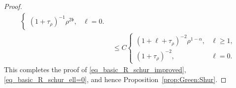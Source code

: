 \documentclass[10pt,a4paper]{amsart}
\begin{document}
\begin{proof}
\begin{align*}
\begin{cases}
        (1+\tau_\rho)^{-1} \rho^{2\mathfrak b}, & \ell=0.
    \end{cases} \\
    &\le C \begin{cases}
        (1+\ell+\tau_\rho)^{-2} \rho^{1-\alpha}, & \ell \ge 1,\\
        (1+\tau_\rho)^{-2}, & \ell=0.
    \end{cases} 
\end{align*}
This completes the proof of \eqref{eq_basic_R_schur_improved}, \eqref{eq_basic_R_schur_ell=0}, and hence Proposition~\ref{prop:Green:Shur}.

\end{proof}
\end{document}
